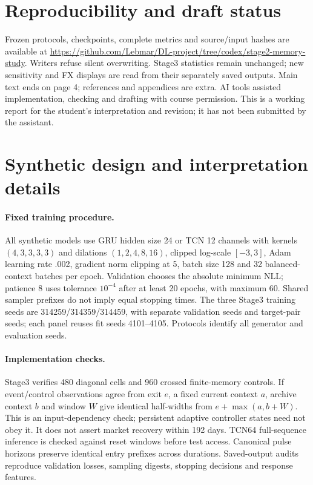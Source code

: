 \documentclass{article}
\begin{document}
\section*{Reproducibility and draft status}
Frozen protocols, checkpoints, complete metrics and source/input hashes are
available at \url{https://github.com/Lebmar/DL-project/tree/codex/stage2-memory-study}.
Writers refuse silent overwriting. Stage3 statistics remain unchanged;
new sensitivity and FX displays are read from their separately saved outputs.
Main text ends on page 4; references and appendices are extra.
AI tools assisted implementation, checking and drafting with course permission.
This is a working report for the student's interpretation and revision;
it has not been submitted by the assistant.

\clearpage
\appendix
\section{Synthetic design and interpretation details}
\paragraph{Fixed training procedure.}
All synthetic models use GRU hidden size 24 or TCN 12 channels with kernels
$(4,3,3,3,3)$ and dilations $(1,2,4,8,16)$, clipped log-scale $[-3,3]$,
Adam learning rate .002, gradient norm clipping at 5, batch size 128 and
32 balanced-context batches per epoch. Validation chooses the absolute
minimum NLL; patience 8 uses tolerance $10^{-4}$ after at least 20 epochs,
with maximum 60. Shared sampler prefixes do not imply equal stopping times.
The three Stage3 training seeds are 314259/314359/314459, with separate
validation seeds and target-pair seeds; each panel reuses fit seeds
4101--4105. Protocols identify all generator and evaluation seeds.

\paragraph{Implementation checks.}
Stage3 verifies 480 diagonal cells and 960 crossed finite-memory controls.
If event/control observations agree from exit $e$, a fixed current context
$a$, archive context $b$ and window $W$ give identical half-widths from
$e+\max(a,b+W)$. This is an input-dependency check; persistent adaptive
controller states need not obey it. It does not assert market recovery
within 192 days. TCN64 full-sequence inference is checked against reset
windows before test access. Canonical pulse horizons preserve identical
entry prefixes across durations. Saved-output audits reproduce validation
losses, sampling digests, stopping decisions and response features.
\end{document}
